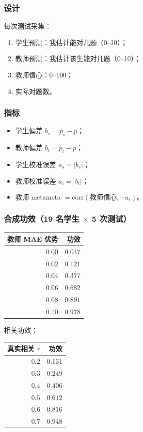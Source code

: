 \documentclass[UTF8,a4paper,11pt]{ctexart}
\begin{document}
\subsubsection{设计}

每次测试采集：

\begin{enumerate}[leftmargin=2em]
\item 学生预测：我估计能对几题（0--10）；
\item 教师预测：我估计该生能对几题（0--10）；
\item 教师信心：0--100；
\item 实际对题数。
\end{enumerate}

\subsubsection{指标}

\begin{itemize}[leftmargin=2em]
\item 学生偏差 $b_s=\hat p_s-p$；
\item 教师偏差 $b_t=\hat p_t-p$；
\item 学生校准误差 $a_s=|b_s|$；
\item 教师校准误差 $a_t=|b_t|$；
\item 教师 metameta $=\mathrm{corr}(\text{教师信心},-a_t)$。
\end{itemize}

\subsubsection{合成功效（19 名学生 $\times$ 5 次测试）}

\begin{center}
\begin{longtable}{@{}rr@{}}
\toprule
\textbf{教师 MAE 优势} & \textbf{功效} \\
\midrule
$0.00$ & $0.047$ \\
$0.02$ & $0.121$ \\
$0.04$ & $0.377$ \\
$0.06$ & $0.682$ \\
$0.08$ & $0.891$ \\
$0.10$ & $0.978$ \\
\bottomrule
\end{longtable}
\end{center}

相关功效：

\begin{center}
\begin{longtable}{@{}rr@{}}
\toprule
\textbf{真实相关 $r$} & \textbf{功效} \\
\midrule
$0.2$ & $0.131$ \\
$0.3$ & $0.249$ \\
$0.4$ & $0.406$ \\
$0.5$ & $0.612$ \\
$0.6$ & $0.816$ \\
$0.7$ & $0.948$ \\
\bottomrule
\end{longtable}
\end{center}
\end{document}
